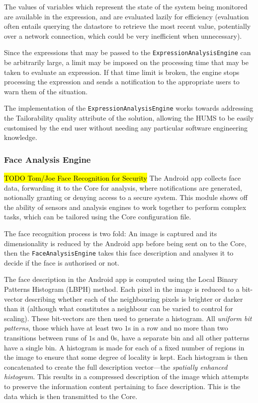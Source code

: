 \documentclass[10pt,a4paper]{article}
\begin{document}
The values of variables which represent the state of the system being monitored are available in the expression, and are evaluated lazily for efficiency (evaluation often entails querying the datastore to retrieve the most recent value, potentially over a network connection, which could be very inefficient when unnecessary).

Since the expressions that may be passed to the \texttt{ExpressionAnalysisEngine} can be arbitrarily large, a limit may be imposed on the processing time that may be taken to evaluate an expression. If that time limit is broken, the engine stops processing the expression and sends a notification to the appropriate users to warn them of the situation.

The implementation of the \texttt{ExpressionAnalysisEngine} works towards addressing the Tailorability quality attribute of the solution, allowing the HUMS to be easily customised by the end user without needing any particular software engineering knowledge. %


\subsubsection{Face Analysis Engine}
\label{sec:fae}

\hl{TODO Tom/Joe Face Recognition for Security}
The Android app collects face data, forwarding it to the Core for analysis, where notifications are generated, notionally granting or denying access to a secure system. This module shows off the ability of sensors and analysis engines to work together to perform complex tasks, which can be tailored using the Core configuration file.

The face recognition process is two fold: An image is captured and its dimensionality is reduced by the Android app before being sent on to the Core, then the \texttt{FaceAnalysisEngine} takes this face description and analyses it to decide if the face is authorised or not.

The face description in the Android app is computed using the Local Binary Patterns Histogram (LBPH) \cite{ahonen2006face} method. Each pixel in the image is reduced to a bit-vector describing whether each of the neighbouring pixels is brighter or darker than it (although what constitutes a neighbour can be varied to control for scaling). These bit-vectors are then used to generate a histogram. All \emph{uniform bit patterns}, those which have at least two $1$s in a row and no more than two transitions between runs of $1$s and $0$s, have a separate bin and all other patterns have a single bin. A histogram is made for each of a fixed number of regions in the image to ensure that some degree of locality is kept. Each histogram is then concatenated to create the full description vector---the \emph{spatially enhanced histogram}. This results in a compressed description of the image which attempts to preserve the information content pertaining to face description. This is the data which is then transmitted to the Core.
\end{document}
